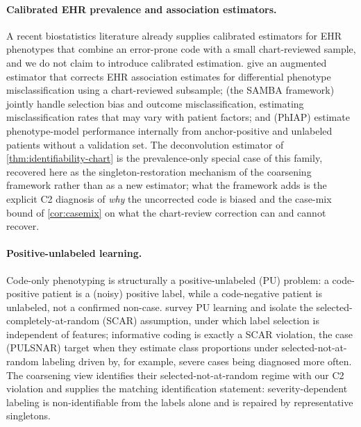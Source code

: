 \paragraph{Calibrated EHR prevalence and association estimators.} A
recent biostatistics literature already supplies calibrated estimators
for EHR phenotypes that combine an error-prone code with a small
chart-reviewed sample, and we do not claim to introduce calibrated
estimation. \citet{tong2020augmented} give an augmented estimator that
corrects EHR association estimates for differential phenotype
misclassification using a chart-reviewed subsample;
\citet{beesley2022samba} (the SAMBA framework) jointly handle
selection bias and outcome misclassification, estimating
misclassification rates that may vary with patient factors; and
\citet{zhang2019phiap} (PhIAP) estimate phenotype-model performance
internally from anchor-positive and unlabeled patients without a
validation set. The deconvolution estimator of
\cref{thm:identifiability-chart} is the prevalence-only special case of
this family, recovered here as the singleton-restoration mechanism of
the coarsening framework rather than as a new estimator; what the
framework adds is the explicit C2 diagnosis of \emph{why} the
uncorrected code is biased and the case-mix bound of \cref{cor:casemix}
on what the chart-review correction can and cannot recover.

\paragraph{Positive-unlabeled learning.} Code-only phenotyping is
structurally a positive-unlabeled (PU) problem: a code-positive patient
is a (noisy) positive label, while a code-negative patient is
unlabeled, not a confirmed non-case. \citet{bekker2020pulearning}
survey PU learning and isolate the selected-completely-at-random (SCAR)
assumption, under which label selection is independent of features;
informative coding is exactly a SCAR violation, the case
\citet{kumar2024pulsnar} (PULSNAR) target when they estimate class
proportions under selected-not-at-random labeling driven by, for
example, severe cases being diagnosed more often. The coarsening view
identifies their selected-not-at-random regime with our C2 violation
and supplies the matching identification statement: severity-dependent
labeling is non-identifiable from the labels alone and is repaired by
representative singletons.

